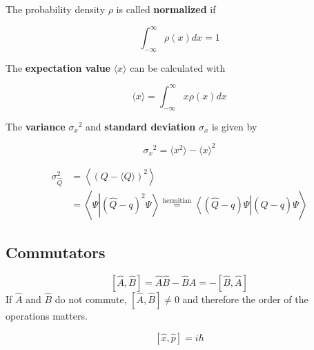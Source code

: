 The probability density $\rho$ is called \textbf{normalized} if

\begin{equation*}
    \int_{-\infty}^{\infty}\rho(x)dx = 1
\end{equation*}

The \textbf{expectation value} $\langle x \rangle$ can be calculated with

\begin{equation*}
    \langle x \rangle = \int_{-\infty}^{\infty} x\rho(x) dx
\end{equation*}

The \textbf{variance} ${\sigma_x}^2$ and \textbf{standard deviation} $\sigma_x$ is given by

\begin{equation*}
    {\sigma_x}^2 = \langle x^2 \rangle - {\langle x \rangle }^2
\end{equation*}

\begin{align*}
    \sigma_{\hat{Q}}^{2} & =\left\langle{\left(Q-\langle Q\rangle\right)}^{2}\right\rangle                                                                                                                        \\
                         & =\left\langle\Psi\left|{\left(\hat{Q}-q\right)}^{2}\Psi\right\rangle\stackrel{\text{hermitian}}{=}\left\langle\left(\hat{Q}-q\right)\Psi\right|\left(\hat{Q}-q\right)\Psi\right\rangle
\end{align*}

\subsection{Commutators}\label{comm}

\noindent\begin{equation*}
    \left[\widehat{A},\widehat{B}\right] = \widehat{A}\widehat{B} - \widehat{B}\widehat{A} = -\left[\widehat{B},\widehat{A}\right]
\end{equation*}
If $\widehat{A}$ and $\widehat{B}$ do not commute, $\left[\widehat{A},\widehat{B}\right] \neq 0$ and therefore the order of the operations matters.

\newpar{}


\begin{equation*}
    \left[\hat{x},\hat{p}\right] = i\hbar
\end{equation*}

